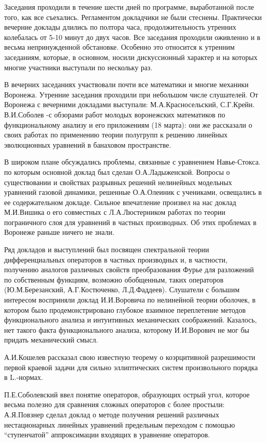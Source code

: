 Заседания проходили в течение шести дней по программе, выработанной после того, как все съехались. Регламентом докладчики не были стеснены. Практически вечерние доклады длились по полтора часа, продолжительность утренних колебалась от 5-10 минут до двух часов. Все заседания проходили оживленно и в весьма непринужденной обстановке. Особенно это относится к утренним заседаниям, которые, в основном, носили дискуссионный характер и на которых многие участники выступали по нескольку раз.

В вечерних заседаниях участвовали почти все математики и многие механики Воронежа. Утренние заседания проходили при небольшом числе слушателей. От Воронежа с вечерними докладами выступали: М.А.Красносельский, С.Г.Крейн. В.И.Соболев -с обзорами работ молодых воронежских математиков по функциональному анализу и его приложениям (18 марта): они же рассказали о своих работах по применению теории полугрупп к решению линейных эволюционных уравнений в банаховом пространстве.

В широком плане обсуждались проблемы, связанные с уравнением Навье-Стокса. по которым основной доклад был сделан О.А.Ладыженской. Вопросы о существовании и свойствах разрывных решений нелинейных модельных уравнений газовой динамики, решенные О.А.Олеиник с учениками, освещались в ее содержательном докладе. Сильное впечатление произвел на нас доклад М.И.Вишика о его совместных с Л.А.Люстерником работах по теории пограничного слоя для уравнений в частных производных. Об этих проблемах в Воронеже раньше ничего не знали.

Ряд докладов и выступлений был посвящен спектральной теории дифференциальных операторов в частных производных и, в частности, получению аналогов различных свойств преобразования Фурье для разложений по собственным функциям, возможно обобщенным, таких операторов (Ю.М.Березанский, А.Г.Костюченко, Л.Д.Фаддеев). Слушатели с большим интересом восприняли доклад И.И.Воровича по нелинейной теории оболочек, в котором было продемонстрировано глубокое взаимное переплетение методов функционального анализа и интуитивных механических соображений. Казалось, нет такого факта функционального анализа, которому И.И.Ворович не мог бы придать механический смысл.

А.И.Кошелев рассказал свою известную теорему о коэрцитивной разрешимости первой краевой задачи для сильно эллиптических систем произвольного порядка в L.-нормах.

П.Е.Соболевский ввел понятие операторов, образующих острый угол,  которое весьма полезно для сравнения сложных операторов с более простыли: А.Я.Повзнер сделал доклад о методе получения решений различных нестационарных линейных уравнений предельным переходом с помощью “ступенчатой”  аппроксимации входящих в уравнение операторов.

